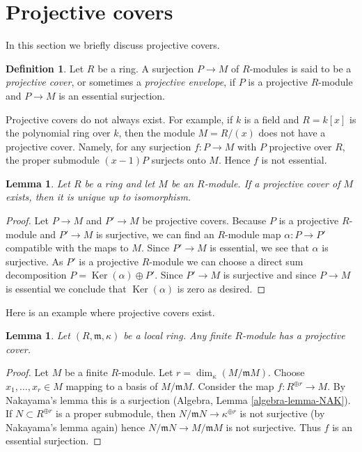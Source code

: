 \documentclass{stacks-project}
\theoremstyle{plain}
\newtheorem{lemma}[subsection]{Lemma}
\theoremstyle{definition}
\newtheorem{definition}[subsection]{Definition}
\theoremstyle{remark}
\numberwithin{equation}{subsection}
\def\Ker{\mathop{\mathrm{Ker}}}
\begin{document}
\section{Projective covers}
\label{section-projective-cover}

\noindent
In this section we briefly discuss projective covers.

\begin{definition}
\label{definition-projective-cover}
Let $R$ be a ring. A surjection $P \to M$ of $R$-modules is said
to be a {\it projective cover}, or sometimes a {\it projective envelope},
if $P$ is a projective $R$-module and $P \to M$ is an essential
surjection.
\end{definition}

\noindent
Projective covers do not always exist. For example, if $k$ is a field
and $R = k[x]$ is the polynomial ring over $k$, then the module $M = R/(x)$
does not have a projective cover. Namely, for any surjection $f : P \to M$
with $P$ projective over $R$, the proper submodule $(x - 1)P$ surjects
onto $M$. Hence $f$ is not essential.

\begin{lemma}
\label{lemma-projective-cover-unique}
Let $R$ be a ring and let $M$ be an $R$-module. If a projective cover
of $M$ exists, then it is unique up to isomorphism.
\end{lemma}

\begin{proof}
Let $P \to M$ and $P' \to M$ be projective covers. Because $P$ is a
projective $R$-module and $P' \to M$ is surjective, we can find an
$R$-module map $\alpha : P \to P'$ compatible with the maps to $M$.
Since $P' \to M$ is essential, we see that $\alpha$ is surjective.
As $P'$ is a projective $R$-module we can choose a direct sum decomposition
$P = \Ker(\alpha) \oplus P'$. Since $P' \to M$ is surjective
and since $P \to M$ is essential we conclude that $\Ker(\alpha)$
is zero as desired.
\end{proof}

\noindent
Here is an example where projective covers exist.

\begin{lemma}
\label{lemma-projective-covers-local}
Let $(R, \mathfrak m, \kappa)$ be a local ring. Any finite $R$-module has
a projective cover.
\end{lemma}

\begin{proof}
Let $M$ be a finite $R$-module. Let $r = \dim_\kappa(M/\mathfrak m M)$.
Choose $x_1, \ldots, x_r \in M$ mapping to a basis of $M/\mathfrak m M$.
Consider the map $f : R^{\oplus r} \to M$. By Nakayama's lemma this is
a surjection (Algebra, Lemma \ref{algebra-lemma-NAK}). If
$N \subset R^{\oplus r}$ is a proper submodule, then
$N/\mathfrak m N \to \kappa^{\oplus r}$ is not surjective (by
Nakayama's lemma again) hence $N/\mathfrak m N \to M/\mathfrak m M$
is not surjective. Thus $f$ is an essential surjection.
\end{proof}
\end{document}
